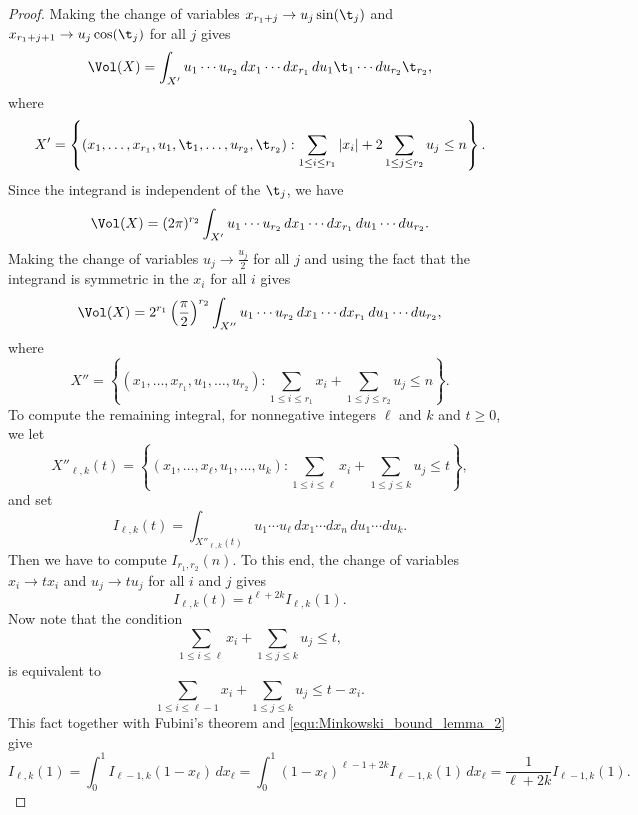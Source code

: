       \begin{proof}
        Making the change of variables $x_{r_{1}+j} \to u_{j}\sin(\t_{j})$ and $x_{r_{1}+j+1} \to u_{j}\cos(\t_{j})$ for all $j$ gives
        \[
          \Vol(X) = \int_{X'}u_{1} \cdots u_{r_{2}}\,dx_{1} \cdots dx_{r_{1}}\,du_{1}\t_{1} \cdots du_{r_{2}}\t_{r_{2}},
        \]
        where
        \[
          X' = \left\{(x_{1},\ldots,x_{r_{1}},u_{1},\t_{1},\ldots,u_{r_{2}},\t_{r_{2}}):\sum_{1 \le i \le r_{1}}|x_{i}|+2\sum_{1 \le j \le r_{2}}u_{j} \le n\right\}.
        \]
        Since the integrand is independent of the $\t_{j}$, we have
        \[
          \Vol(X) = (2\pi)^{r_{2}}\int_{X'}u_{1} \cdots u_{r_{2}}\,dx_{1} \cdots dx_{r_{1}}\,du_{1} \cdots du_{r_{2}}.
        \]
        Making the change of variables $u_{j} \to \frac{u_{j}}{2}$ for all $j$ and using the fact that the integrand is symmetric in the $x_{i}$ for all $i$ gives
        \begin{equation}\label{equ:Minkowski_bound_lemma_1}
          \Vol(X) = 2^{r_{1}}\left(\frac{\pi}{2}\right)^{r_{2}}\int_{X''}u_{1} \cdots u_{r_{2}}\,dx_{1} \cdots dx_{r_{1}}\,du_{1} \cdots du_{r_{2}},
        \end{equation}
        where
        \[
          X'' = \left\{(x_{1},\ldots,x_{r_{1}},u_{1},\ldots,u_{r_{2}}):\sum_{1 \le i \le r_{1}}x_{i}+\sum_{1 \le j \le r_{2}}u_{j} \le n\right\}.
        \]
        To compute the remaining integral, for nonnegative integers $\ell$ and $k$ and $t \ge 0$, we let
        \[
          X''_{\ell,k}(t) = \left\{(x_{1},\ldots,x_{\ell},u_{1},\ldots,u_{k}):\sum_{1 \le i \le \ell}x_{i}+\sum_{1 \le j \le k}u_{j} \le t\right\},
        \]
        and set 
        \[
          I_{\ell,k}(t) = \int_{X''_{\ell,k}(t)}u_{1} \cdots u_{\ell}\,dx_{1} \cdots dx_{n}\,du_{1} \cdots du_{k}.
        \]
        Then we have to compute $I_{r_{1},r_{2}}(n)$. To this end, the change of variables $x_{i} \to tx_{i}$ and $u_{j} \to tu_{j}$ for all $i$ and $j$ gives
        \begin{equation}\label{equ:Minkowski_bound_lemma_2}
          I_{\ell,k}(t) = t^{\ell+2k}I_{\ell,k}(1).
        \end{equation}
        Now note that the condition
        \[
          \sum_{1 \le i \le \ell}x_{i}+\sum_{1 \le j \le k}u_{j} \le t,
        \]
        is equivalent to
        \[
          \sum_{1 \le i \le \ell-1}x_{i}+\sum_{1 \le j \le k}u_{j} \le t-x_{i}.
        \]
        This fact together with Fubini's theorem and \cref{equ:Minkowski_bound_lemma_2} give
        \[
          I_{\ell,k}(1) = \int_{0}^{1}I_{\ell-1,k}(1-x_{\ell})\,dx_{\ell} = \int_{0}^{1}(1-x_{\ell})^{\ell-1+2k}I_{\ell-1,k}(1)\,dx_{\ell} = \frac{1}{\ell+2k}I_{\ell-1,k}(1).
\]
\end{proof}
